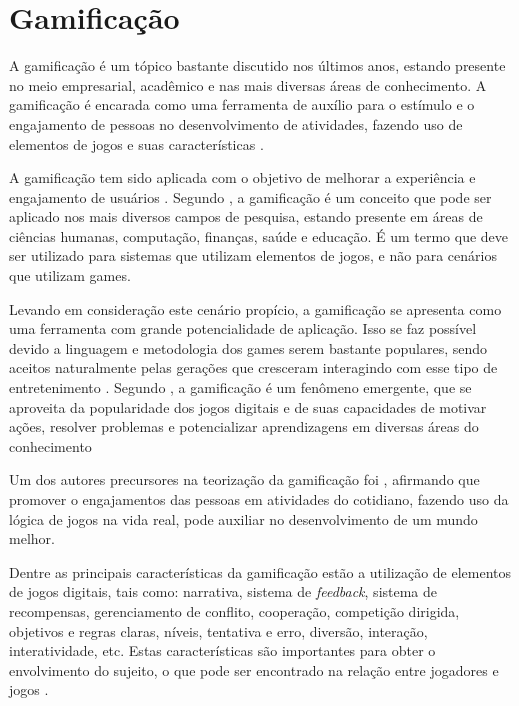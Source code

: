 \documentclass[
	12pt,				%
	oneside,			%
	a4paper,			%
	english,			%
	french,				%
	spanish,			%
	brazil,				%
	]{abntex2}
\begin{document}
\chapter{Gamificação}

A gamificação é um tópico bastante discutido nos últimos anos, estando presente no meio empresarial, acadêmico e nas mais diversas áreas de conhecimento. A gamificação é encarada como uma ferramenta de auxílio para o estímulo e o engajamento de pessoas no desenvolvimento de atividades, fazendo uso de elementos de jogos e suas características \cite{quadros2016gamificaccao}.

A gamificação tem sido aplicada com o objetivo de melhorar a experiência e engajamento de usuários \cite{quadros2016gamificaccao}. Segundo \citet{deterding2011game}, a gamificação é um conceito que pode ser aplicado nos mais diversos campos de pesquisa, estando presente em áreas de ciências humanas, computação, finanças, saúde e educação. É um termo que deve ser utilizado para sistemas que utilizam elementos de jogos, e não para cenários que utilizam games. 

Levando em consideração este cenário propício, a gamificação se apresenta como uma ferramenta com grande potencialidade de aplicação. Isso se faz possível devido a linguagem e metodologia dos games serem bastante populares, sendo aceitos naturalmente pelas gerações que cresceram interagindo com esse tipo de entretenimento \cite{fardo2013gamificaccao}. Segundo \citet{deterding2011game}, a gamificação é um fenômeno emergente, que se aproveita da popularidade dos jogos digitais e de suas capacidades de motivar ações, resolver problemas e potencializar aprendizagens em diversas áreas do conhecimento

Um dos autores precursores na teorização da gamificação foi \citet{mcgonigal2011reality}, afirmando que promover o engajamentos das pessoas em atividades do cotidiano, fazendo uso da lógica de jogos na vida real, pode auxiliar no desenvolvimento de um mundo melhor.

Dentre as principais características da gamificação estão a utilização de elementos de jogos digitais, tais como: narrativa, sistema de \textit{feedback}, sistema de recompensas, gerenciamento de conflito, cooperação, competição dirigida, objetivos e regras claras, níveis, tentativa e erro, diversão, interação, interatividade, etc. Estas características são importantes para obter o envolvimento do sujeito, o que pode ser encontrado na relação entre jogadores e jogos \cite{deterding2011game}.
\end{document}
